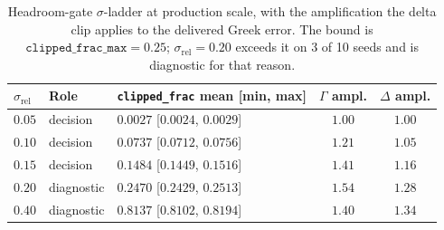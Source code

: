\documentclass{article}
\begin{document}
\begin{table}[h]
\caption{Headroom-gate $\sigma$-ladder at production scale, with the amplification
the delta clip applies to the delivered Greek error. The bound is
$\texttt{clipped\_frac\_max} = 0.25$; $\sigma_{\mathrm{rel}} = 0.20$ exceeds it on
3 of 10 seeds and is diagnostic for that reason.}
\label{tab:ladder}
\centering\footnotesize\setlength{\tabcolsep}{5pt}
\begin{tabular}{@{}lllcc@{}}
\toprule
$\sigma_{\mathrm{rel}}$ & Role & \texttt{clipped\_frac} mean [min, max] & $\Gamma$ ampl. & $\Delta$ ampl. \\
\midrule
$0.05$ & decision & $0.0027$ [$0.0024$, $0.0029$] & $1.00$ & $1.00$ \\
$0.10$ & decision & $0.0737$ [$0.0712$, $0.0756$] & $1.21$ & $1.05$ \\
$0.15$ & decision & $0.1484$ [$0.1449$, $0.1516$] & $1.41$ & $1.16$ \\
$0.20$ & diagnostic & $0.2470$ [$0.2429$, $0.2513$] & $1.54$ & $1.28$ \\
$0.40$ & diagnostic & $0.8137$ [$0.8102$, $0.8194$] & $1.40$ & $1.34$ \\
\bottomrule
\end{tabular}
\end{table}

\newpage

\end{document}
